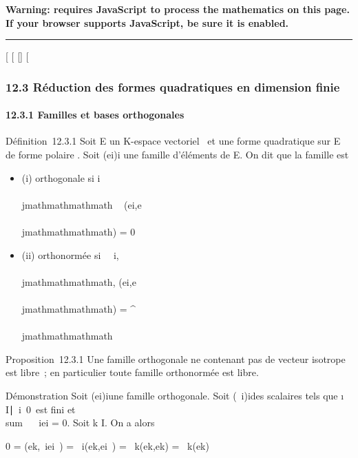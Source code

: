 \textbf{Warning: 
requires JavaScript to process the mathematics on this page.\\ If your
browser supports JavaScript, be sure it is enabled.}

\begin{center}\rule{3in}{0.4pt}\end{center}

{[}
{[}
{[}{]}
{[}

\subsubsection{12.3 Réduction des formes quadratiques en dimension
finie}

\paragraph{12.3.1 Familles et bases orthogonales}

Définition~12.3.1 Soit E un K-espace vectoriel ~et \Phi une forme
quadratique sur E de forme polaire \phi. Soit (ei)i\inI
une famille d'éléments de E. On dit que la famille est

\begin{itemize}
\itemsep1pt\parskip0pt
\item
  (i) orthogonale si i\neq~\\\\jmathmathmathmath \rigtharrow~
  \phi(ei,e\\\\jmathmathmathmath) = 0
\item
  (ii) orthonormée si \forall~~i,\\\\jmathmathmathmath,
  \phi(ei,e\\\\jmathmathmathmath) = \deltai^\\\\jmathmathmathmath
\end{itemize}

Proposition~12.3.1 Une famille orthogonale ne contenant pas de vecteur
isotrope est libre~; en particulier toute famille orthonormée est libre.

Démonstration Soit (ei)i\inI une famille orthogonale.
Soit (\lambda~i)i\inI des scalaires tels que
\i \in
I∣\lambda~i\mathrel\neq~0\
est fini et \\sum ~
\lambda~iei = 0. Soit k \in I. On a alors

0 = \phi(ek,\sum \lambda~iei~)
= \sum \lambda~i\phi(ek,ei~) =
\lambda~k\phi(ek,ek) = \lambda~k\Phi(ek)

